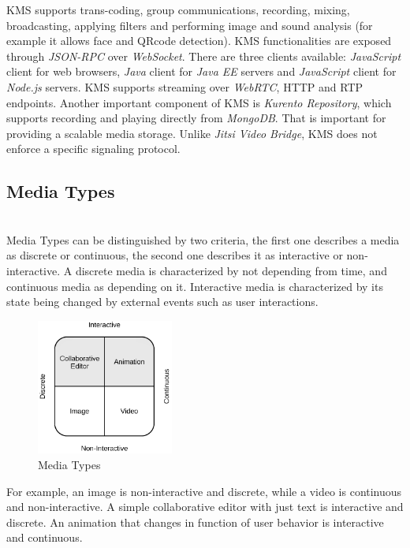 	
	  \ac{KMS} supports trans-coding, group communications, recording, mixing, broadcasting, applying filters and performing image and sound analysis (for example it allows face and QRcode detection). \ac{KMS} functionalities are exposed through \emph{JSON-RPC} over \emph{WebSocket}.
          There are three clients available: \emph{JavaScript} client for web browsers, \emph{Java} client for \emph{Java EE} servers and \emph{JavaScript} client for \emph{Node.js} servers. 
	\ac{KMS} supports streaming over \emph{WebRTC}, \ac{HTTP} and \ac{RTP} endpoints. Another important component of \ac{KMS} is \emph{Kurento Repository}, which supports recording and playing directly from \emph{MongoDB}. That is important for providing a scalable media storage. Unlike \emph{Jitsi Video Bridge}, \ac{KMS} does not enforce a specific signaling protocol.
	

\subsection{Media Types}\label{mediatype}~\\
	Media Types can be distinguished by two criteria, the first one describes a media as discrete or continuous, the second one describes it as interactive or non-interactive. A discrete media is characterized by not depending from time, and continuous media as depending on it. Interactive media is characterized by its state being changed by external events such as user interactions.
\begin{figure}
	\centering
	\includegraphics[width=0.4\textwidth]{figures/media_types.png}
	\caption{Media Types}
\end{figure}
	For example, an image is non-interactive and discrete, while a video is continuous and non-interactive. A simple collaborative editor with just text is interactive and discrete. An animation that changes in function of user behavior is interactive and continuous.

